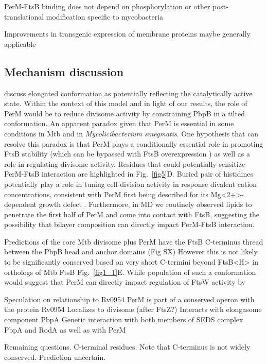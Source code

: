 \documentclass[twocolumn,pdflatex,sn-nature]{sn-jnl}%
\def\textsuperscript#1{<#1>}%
\newcommand\mtb{Mtb}
\newcommand\msmegfull{\textit{Mycolicibacterium smegmatis}}
\newcommand\ftsbH{FtsB\textsuperscript{H}}
\begin{document}
PerM-FtsB binding does not depend on phosphorylation or other post-translational modification specific to mycobacteria

Improvements in transgenic expression of membrane proteins maybe generally applicable

\subsection{Mechanism discussion}
\citep{kashammerCryoEMStructureBacterial2023} discuss elongated conformation as potentially reflecting the catalytically active state.
Within the context of this model and in light of our results, the role of PerM would be to reduce divisome activity by constraining PbpB in a tilted conformation. 
An apparent paradox given that PerM is essential in some conditions in \mtb{} and in \msmegfull{}.
One hypothesis that can resolve this paradox is that PerM plays a conditionally essential role in promoting FtsB stability (which can be bypassed with FtsB overexpression \citep{wangPersistentMycobacteriumTuberculosis2019}) as well as a role in regulating divisome activity.
Residues that could potentially sensitize PerM-FtsB interaction are highlighted in Fig.~\ref{fig5}D.
Buried pair of histidines potentially play a role in tuning cell-division activity in response divalent cation concentrations, consistent with PerM first being described for its Mg\textsuperscript{2+}-dependent growth defect \citep{goodsmithDisruptionTuberculosisMembrane2015}.
Furthermore, in MD we routinely observed lipids to penetrate the first half of PerM and come into contact with FtsB, suggesting the possibility that bilayer composition can directly impact PerM-FtsB interaction.

Predictions of the core Mtb divisome plus PerM have the FtsB C-terminus thread between the PbpB head and anchor domains (Fig SX)
However this is not likely to be significantly conserved based on very short C-termini beyond \ftsbH{} in orthologs of \mtb{} FtsB Fig.~\ref{fig1_1}E.
While population of such a conformation would suggest that PerM can directly impact regulation of FtsW activity by 

Speculation on relationship to Rv0954
PerM is part of a conserved operon with the protein Rv0954
Localizes to divisome (after FtsZ?)
Interacts with elongasome component PbpA
Genetic interaction with both members of SEDS complex PbpA and RodA as well as with PerM

Remaining questions. C-terminal residues. Note that C-terminus is not widely conserved. Prediction uncertain.
\end{document}
